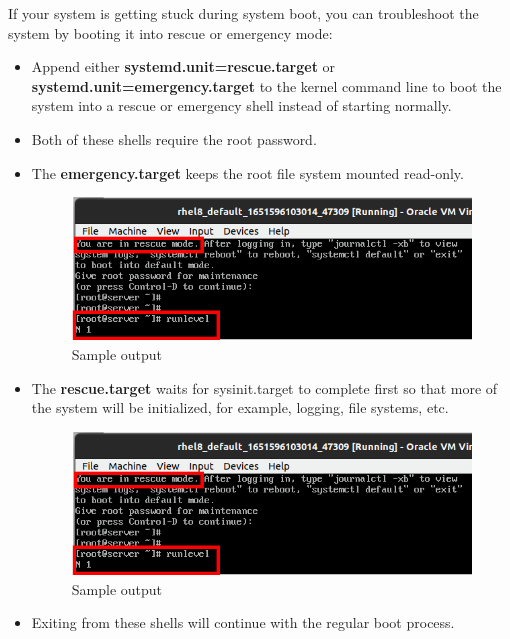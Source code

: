 \begin{flushleft}
	If your system is getting stuck during system boot, you can troubleshoot the system by booting it into rescue or emergency mode:
\bigskip
\begin{itemize}
	\item Append either \textbf{systemd.unit=rescue.target} or \textbf{systemd.unit=emergency.target} to the kernel command line to boot the system into a  rescue or emergency shell instead of starting normally. 
	\item Both of these shells require the root password. 
	\item The \textbf{emergency.target} keeps the root file system mounted read-only.
	\begin{figure}[h!]
		\centering
		\includegraphics[scale=.6]{content/chapter1/images/emer.png}
		\caption{Sample output}
		\label{fig:free_h_s_2_3}
	\end{figure}
	
	\item The \textbf{rescue.target} waits for sysinit.target to complete first so that more of the system will be initialized, for example, logging, file systems, etc. 
	\begin{figure}[h!]
		\centering
		\includegraphics[scale=.6]{content/chapter1/images/rescue2.png}
		\caption{Sample output}
		\label{fig:free_h_s_2_4}
	\end{figure}
	
	\item Exiting from these shells will continue with the regular boot process.
\end{itemize}
\end{flushleft}

\newpage